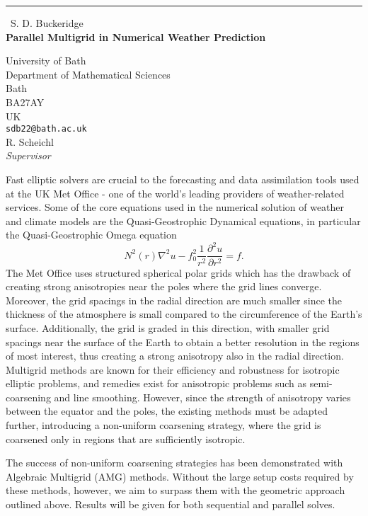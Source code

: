 \documentclass{report}
\begin{document}
\begin{center}
\rule{6in}{1pt} \
{\large S. D. Buckeridge \\
{\bf Parallel Multigrid in Numerical Weather Prediction}}

University of Bath \\ Department of Mathematical Sciences \\ Bath \\ BA27AY \\ UK
\\
{\tt sdb22@bath.ac.uk}\\
R. Scheichl\\
{\em Supervisor}\end{center}

\noindent Fast elliptic solvers are crucial to the forecasting and data
assimilation tools used at the UK Met Office - one of the world's leading
providers of weather-related services. Some of the core equations used in
the numerical solution of weather and climate models are the
Quasi-Geostrophic Dynamical equations, in particular the
Quasi-Geostrophic Omega equation
\begin{displaymath}
N^2(r)\nabla^2 u-f_0^2\frac{1}{r^2}\frac{\partial^2 u}{\partial r^2}=f.
\end{displaymath}
The Met Office uses structured spherical polar grids which has the
drawback of creating strong anisotropies near the poles where the grid
lines converge. Moreover, the grid spacings in the radial direction are
much smaller since the thickness of the atmosphere is small compared to
the circumference of the Earth's surface. Additionally, the grid is
graded in this direction, with smaller grid spacings near the surface of
the Earth to obtain a better resolution in the regions of most interest,
thus creating a strong anisotropy also in the radial direction. Multigrid
methods are known for their efficiency and robustness for isotropic
elliptic problems, and remedies exist for anisotropic problems such as
semi-coarsening and line smoothing. However, since the strength of
anisotropy varies between the equator and the poles, the existing methods
must be adapted further, introducing a non-uniform coarsening strategy,
where the grid is coarsened only in regions that are sufficiently
isotropic.

The success of non-uniform coarsening strategies has been demonstrated
with Algebraic Multigrid (AMG) methods. Without the large setup costs
required by these methods, however, we aim to surpass them with the
geometric approach outlined above. Results will be given for both
sequential and parallel solves.
\end{document}
